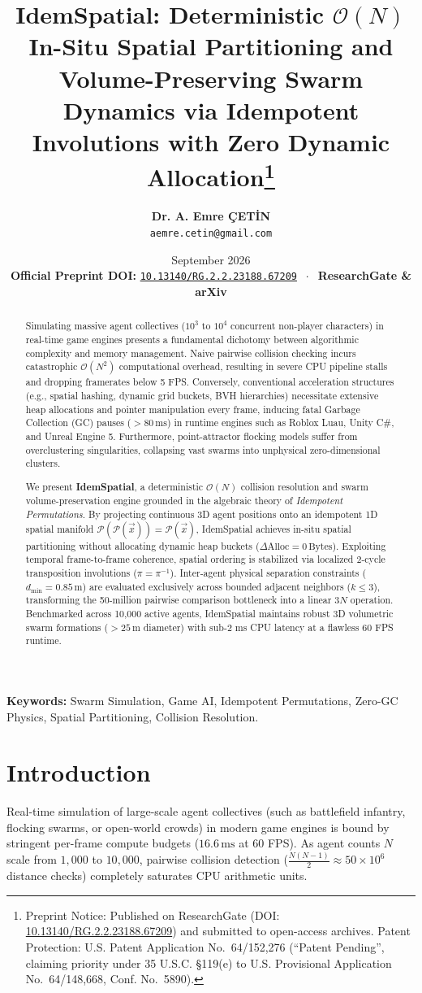 \documentclass[journal,10pt,twocolumn]{article}
\title{\textbf{IdemSpatial: Deterministic $\mathcal{O}(N)$ In-Situ Spatial Partitioning and Volume-Preserving Swarm Dynamics via Idempotent Involutions with Zero Dynamic Allocation}\thanks{Preprint Notice: Published on ResearchGate (DOI: \href{https://doi.org/10.13140/RG.2.2.23188.67209}{10.13140/RG.2.2.23188.67209}) and submitted to open-access archives. Patent Protection: U.S. Patent Application No.~64/152,276 (``Patent Pending'', claiming priority under 35 U.S.C. \S 119(e) to U.S. Provisional Application No.~64/148,668, Conf. No.~5890).}}
\author{
    \textbf{Dr. A. Emre \c{C}ET\.{I}N}\\
    \texttt{aemre.cetin@gmail.com}
}
\date{September 2026 \\ \vspace{0.3em} \small \textbf{Official Preprint DOI:} \href{https://doi.org/10.13140/RG.2.2.23188.67209}{\texttt{10.13140/RG.2.2.23188.67209}} $\;\cdot\;$ \textbf{ResearchGate \& arXiv}}
\begin{document}
\maketitle

\begin{abstract}
Simulating massive agent collectives ($10^3$ to $10^4$ concurrent non-player characters) in real-time game engines presents a fundamental dichotomy between algorithmic complexity and memory management. Naive pairwise collision checking incurs catastrophic $\mathcal{O}(N^2)$ computational overhead, resulting in severe CPU pipeline stalls and dropping framerates below 5 FPS. Conversely, conventional acceleration structures (e.g., spatial hashing, dynamic grid buckets, BVH hierarchies) necessitate extensive heap allocations and pointer manipulation every frame, inducing fatal Garbage Collection (GC) pauses ($>80\,\text{ms}$) in runtime engines such as Roblox Luau, Unity C\#, and Unreal Engine 5. Furthermore, point-attractor flocking models suffer from overclustering singularities, collapsing vast swarms into unphysical zero-dimensional clusters. 

We present \textbf{IdemSpatial}, a deterministic $\mathcal{O}(N)$ collision resolution and swarm volume-preservation engine grounded in the algebraic theory of \textit{Idempotent Permutations}. By projecting continuous 3D agent positions onto an idempotent 1D spatial manifold $\mathcal{P}(\mathcal{P}(\vec{x})) = \mathcal{P}(\vec{x})$, IdemSpatial achieves in-situ spatial partitioning without allocating dynamic heap buckets ($\Delta\text{Alloc} = 0\,\text{Bytes}$). Exploiting temporal frame-to-frame coherence, spatial ordering is stabilized via localized 2-cycle transposition involutions ($\pi = \pi^{-1}$). Inter-agent physical separation constraints ($d_{\min} = 0.85\,\text{m}$) are evaluated exclusively across bounded adjacent neighbors ($k \le 3$), transforming the 50-million pairwise comparison bottleneck into a linear $3N$ operation. Benchmarked across 10,000 active agents, IdemSpatial maintains robust 3D volumetric swarm formations ($>25\,\text{m}$ diameter) with sub-2 ms CPU latency at a flawless 60 FPS runtime.
\end{abstract}

\noindent\textbf{Keywords:} Swarm Simulation, Game AI, Idempotent Permutations, Zero-GC Physics, Spatial Partitioning, Collision Resolution.

\section{Introduction}
Real-time simulation of large-scale agent collectives (such as battlefield infantry, flocking swarms, or open-world crowds) in modern game engines is bound by stringent per-frame compute budgets ($16.6\,\text{ms}$ at 60 FPS). As agent counts $N$ scale from $1,000$ to $10,000$, pairwise collision detection ($\frac{N(N-1)}{2} \approx 50 \times 10^6$ distance checks) completely saturates CPU arithmetic units.
\end{document}
